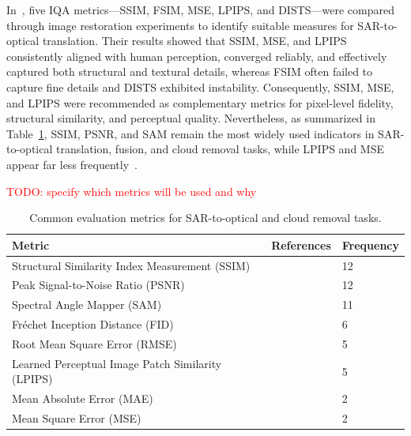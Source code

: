 In~\cite{quality_assessment_S2OT}, five IQA metrics—SSIM, FSIM, MSE, LPIPS, and DISTS—were compared through image restoration experiments to identify suitable measures for SAR-to-optical translation. Their results showed that SSIM, MSE, and LPIPS consistently aligned with human perception, converged reliably, and effectively captured both structural and textural details, whereas FSIM often failed to capture fine details and DISTS exhibited instability. Consequently, SSIM, MSE, and LPIPS were recommended as complementary metrics for pixel-level fidelity, structural similarity, and perceptual quality. Nevertheless, as summarized in Table~\ref{tab:iqa}, SSIM, PSNR, and SAM remain the most widely used indicators in SAR-to-optical translation, fusion, and cloud removal tasks, while LPIPS and MSE appear far less frequently~\cite{sar_2_opt_CGAN_survey_taxonomy}. 

\textcolor{red}{TODO: specify which metrics will be used and why}

\begin{table}[h!]
\centering
\begin{tabular}{lll}
\toprule
\textbf{Metric} & \textbf{References} & \textbf{Frequency} \\
\midrule
Structural Similarity Index Measurement (SSIM)~\cite{iqa_ssim}
 & \cite{CR_Advances_Review_ORS, RS_Data_Fusion_GANs_sota, DiffCR, c_diffusion_s2o, s2o_ViT_cGAN, S2MS_GAN, c_guided_fus_s2ot, transfusion_cr, trans_gan_CF, hvt_cgan, msf_gan, diffusion_memory} 
 & 12 \\
Peak Signal-to-Noise Ratio (PSNR)~\cite{iqa_psnr}
 & \cite{CR_Advances_Review_ORS, DiffCR, CR_RS_spati_atten_GAN, s2o_ViT_cGAN, CR_RS_GAN_s2o, S2MS_GAN, c_guided_fus_s2ot, transfusion_cr, trans_gan_CF, hvt_cgan, msf_gan, diffusion_memory} 
 & 12 \\
Spectral Angle Mapper (SAM)~\cite{iqa_sam}
 & \cite{aCGAN_fuse_sar_MS, RS_Data_Fusion_GANs_sota, CR_RS_GAN_s2o, S2MS_GAN, c_guided_fus_s2ot, transfusion_cr, trans_gan_CF, cond_brownian, hvt_cgan, msf_gan} 
 & 11 \\
Fréchet Inception Distance (FID)~\cite{iqa_fid}
 & \cite{DiffCR, c_diffusion_s2o, s2o_ViT_cGAN, cond_brownian, hvt_cgan, msf_gan} 
 & 6 \\
Root Mean Square Error (RMSE) 
 & \cite{aCGAN_fuse_sar_MS, CR_Advances_Review_ORS, RS_Data_Fusion_GANs_sota, CR_RS_GAN_s2o, c_guided_fus_s2ot} 
 & 5 \\
Learned Perceptual Image Patch Similarity (LPIPS)~\cite{iqa_lpips}
 & \cite{CR_Advances_Review_ORS, DiffCR, S2MS_GAN, cond_brownian, diffusion_memory} 
 & 5 \\
Mean Absolute Error (MAE) 
 & \cite{CR_RS_GAN_s2o, c_guided_fus_s2ot} 
 & 2 \\
Mean Square Error (MSE) 
 & \cite{CR_RS_spati_atten_GAN, trans_gan_CF} 
 & 2 \\
\bottomrule
\end{tabular}
\caption{Common evaluation metrics for SAR-to-optical and cloud removal tasks.}
\label{tab:iqa}
\end{table}

